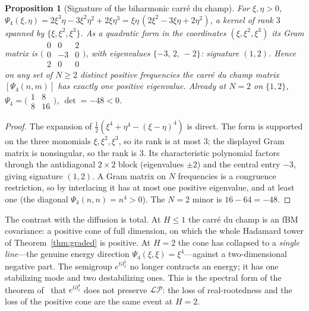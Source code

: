 \documentclass[11pt,reqno]{amsart}
\theoremstyle{plain}
\newtheorem{proposition}[theorem]{Proposition}
\theoremstyle{definition}
\theoremstyle{remark}
\newcommand{\LP}{\mathcal{LP}}
\begin{document}
\begin{proposition}[Signature of the biharmonic carr\'e du champ]
\label{prop:signature}
For $\xi,\eta>0$,
$\Psi_4(\xi,\eta)=2\xi^3\eta-3\xi^2\eta^2+2\xi\eta^3
=\xi\eta\,(2\xi^2-3\xi\eta+2\eta^2)$, a kernel of rank $3$ spanned by
$\{\xi,\xi^2,\xi^3\}$. As a quadratic form in the coordinates
$(\xi,\xi^2,\xi^3)$ its Gram matrix is
$\bigl(\begin{smallmatrix}0&0&2\\0&-3&0\\2&0&0\end{smallmatrix}\bigr)$,
with eigenvalues $\{-3,\,2,\,-2\}$: signature $(1,2)$. Hence on any set
of $N\ge2$ distinct positive frequencies the carr\'e du champ matrix
$[\Psi_4(n,m)]$ has exactly one positive eigenvalue. Already at
$N=2$ on $\{1,2\}$,
$\Psi_4=\bigl(\begin{smallmatrix}1&8\\8&16\end{smallmatrix}\bigr)$,
$\det=-48<0$.
\end{proposition}

\begin{proof}
The expansion of $\tfrac12(\xi^4+\eta^4-(\xi-\eta)^4)$ is direct. The
form is supported on the three monomials $\xi,\xi^2,\xi^3$, so its rank
is at most $3$; the displayed Gram matrix is nonsingular, so the rank
is $3$. Its characteristic polynomial factors through the antidiagonal
$2\times2$ block (eigenvalues $\pm2$) and the central entry $-3$, giving
signature $(1,2)$. A Gram matrix on $N$ frequencies is a congruence
restriction, so by interlacing it has at most one positive eigenvalue,
and at least one (the diagonal $\Psi_4(n,n)=n^4>0$). The $N=2$ minor is
$16-64=-48$.
\end{proof}

The contrast with the diffusion is total. At $H\le1$ the carr\'e du
champ is an fBM covariance: a positive cone of full dimension, on which
the whole Hadamard tower of Theorem~\ref{thm:graded} is positive. At
$H=2$ the cone has collapsed to a \emph{single line}---the genuine
energy direction $\Psi_4(\xi,\xi)=\xi^4$---against a two-dimensional
negative part. The semigroup $e^{t\partial_x^4}$ no longer contracts an
energy; it has one stabilizing mode and two destabilizing ones. This is
the spectral form of the theorem of~\cite{FontesIBM} that
$e^{t\partial_x^4}$ does not preserve $\LP$: the loss of real-rootedness
and the loss of the positive cone are the same event at $H=2$.
\end{document}
